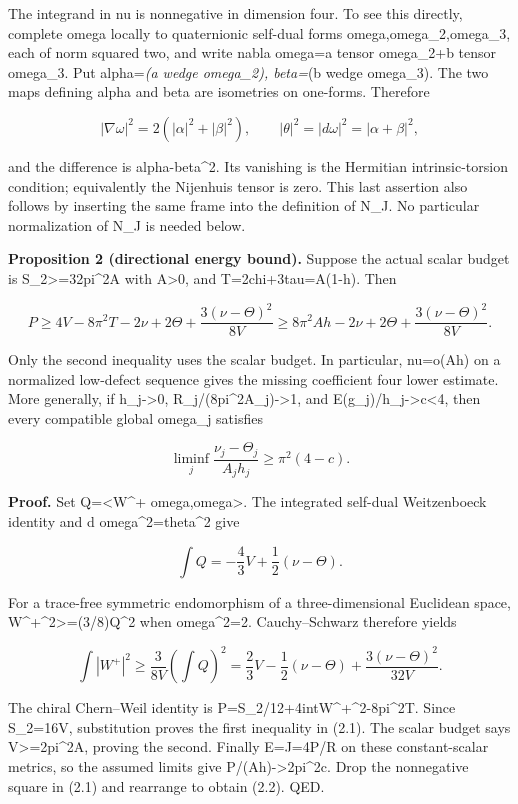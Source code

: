 \documentclass[
  10pt,
]{article}
\begin{document}
The integrand in nu is nonnegative in dimension four. To see this
directly, complete omega locally to quaternionic self-dual forms
omega,omega\_2,omega\_3, each of norm squared two, and write nabla
omega=a tensor omega\_2+b tensor omega\_3. Put alpha=\emph{(a wedge
omega\_2), beta=}(b wedge omega\_3). The two maps defining alpha and
beta are isometries on one-forms. Therefore

\[
 |\nabla\omega|^2=2(|\alpha|^2+|\beta|^2),\qquad
 |\theta|^2=|d\omega|^2=|\alpha+\beta|^2,
\]

and the difference is \textbar alpha-beta\textbar\^{}2. Its vanishing is
the Hermitian intrinsic-torsion condition; equivalently the Nijenhuis
tensor is zero. This last assertion also follows by inserting the same
frame into the definition of N\_J. No particular normalization of
\textbar N\_J\textbar{} is needed below.

\textbf{Proposition 2 (directional energy bound).} Suppose the actual
scalar budget is S\_2\textgreater=32pi\^{}2A with A\textgreater0, and
T=2chi+3tau=A(1-h). Then

\[
 \boxed{
 P\ge4V-8\pi^2T-2\nu+2\Theta
                   +\frac{3(\nu-\Theta)^2}{8V}
 \ge8\pi^2Ah-2\nu+2\Theta
                   +\frac{3(\nu-\Theta)^2}{8V}.}       \tag{2.1}
\]

Only the second inequality uses the scalar budget. In particular,
nu=o(Ah) on a normalized low-defect sequence gives the missing
coefficient four lower estimate. More generally, if h\_j-\textgreater0,
R\_j/(8pi\^{}2A\_j)-\textgreater1, and
E(g\_j)/h\_j-\textgreater c\textless4, then every compatible global
omega\_j satisfies

\[
 \liminf_j\frac{\nu_j-\Theta_j}{A_jh_j}
                  \ge\pi^2(4-c).                    \tag{2.2}
\]

\textbf{Proof.} Set Q=\textless W\^{}+ omega,omega\textgreater. The
integrated self-dual Weitzenboeck identity and \textbar d
omega\textbar\^{}2=\textbar theta\textbar\^{}2 give

\[
 \int Q=-\frac43V+\frac12(\nu-\Theta).
\]

For a trace-free symmetric endomorphism of a three-dimensional Euclidean
space, \textbar W\^{}+\textbar\^{}2\textgreater=(3/8)Q\^{}2 when
\textbar omega\textbar\^{}2=2. Cauchy--Schwarz therefore yields

\[
 \int|W^+|^2\ge\frac{3}{8V}\left(\int Q\right)^2
 =\frac23V-\frac12(\nu-\Theta)
                  +\frac{3(\nu-\Theta)^2}{32V}.
\]

The chiral Chern--Weil identity is
P=S\_2/12+4int\textbar W\^{}+\textbar\^{}2-8pi\^{}2T. Since S\_2=16V,
substitution proves the first inequality in (2.1). The scalar budget
says V\textgreater=2pi\^{}2A, proving the second. Finally E=J=4P/R on
these constant-scalar metrics, so the assumed limits give
P/(Ah)-\textgreater2pi\^{}2c. Drop the nonnegative square in (2.1) and
rearrange to obtain (2.2). QED.
\end{document}
